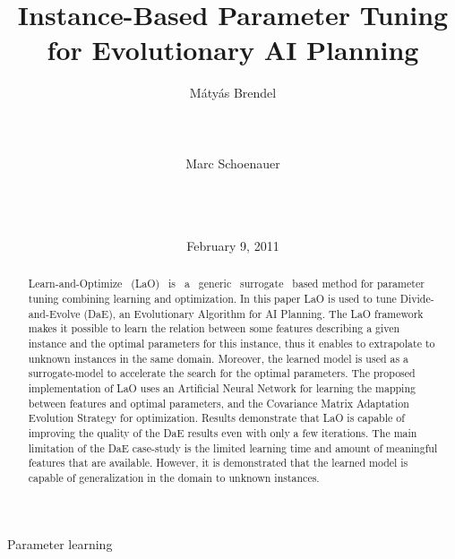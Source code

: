 \documentclass{sig-alt-release2}
\begin{document}
\title{Instance-Based Parameter Tuning\\
for Evolutionary AI Planning}


 
 \author{
 \alignauthor
 M{\'a}ty{\'a}s Brendel\\
        \\
        \\
        \\
 \alignauthor
 Marc Schoenauer\\
        \\
        \\
        \\
 }

\date{February 9, 2011}
\maketitle
\begin{abstract}
 \noindent Learn-and-Optimize ~(LaO) ~is ~a ~generic ~surrogate ~based method for parameter tuning combining learning and optimization. In this paper LaO is used to tune Divide-and-Evolve (DaE), an Evolutionary Algorithm for AI Planning. The LaO framework makes it possible to learn the relation between some features describing a given instance and the optimal parameters for this instance, thus it enables to extrapolate to unknown instances in the same domain. Moreover, the learned model is used as a surrogate-model to accelerate the search for the optimal parameters. The proposed implementation of LaO uses an Artificial Neural Network for learning the mapping between features and optimal parameters, and the Covariance Matrix Adaptation Evolution Strategy for optimization. Results demonstrate that LaO is capable of improving the quality of the DaE results even with only a few iterations. The main limitation of the DaE case-study is the limited learning time and amount of meaningful features that are available. However, it is demonstrated that the learned model is capable of generalization in the domain to unknown instances. 

\end{abstract}

 {Parameter learning}
\end{document}

